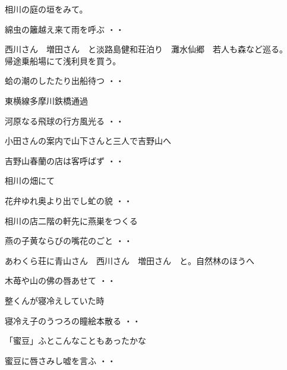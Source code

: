 \vspace{0.6cm}
相川の庭の垣をみて。
\begin{shiika}綿虫の籬越え来て雨を呼ぶ
\hfill{・・}\end{shiika}
\vspace{0.6cm}
西川さん　増田さん　と淡路島健和荘泊り　灘水仙郷　若人も森など巡る。\\
帰途乗船場にて浅利貝を買う。
\begin{shiika}蛤の潮のしたたり出船待つ
\hfill{・・}\end{shiika}
\vspace{0.6cm}
東横線多摩川鉄橋通過
\begin{shiika}河原なる飛球の行方風光る
\hfill{・・}\end{shiika}
\vspace{0.6cm}
小田さんの案内で山下さんと三人で吉野山へ
\begin{shiika}吉野山春蘭の店は客呼ばず
\hfill{・・}\end{shiika}
\vspace{0.6cm}
相川の畑にて
\begin{shiika}花弁ゆれ奥より出でし虻の貌
\hfill{・・}\end{shiika}
\vspace{0.6cm}
相川の店二階の軒先に燕巣をつくる
\begin{shiika}燕の子黄ならびの嘴花のごと
\hfill{・・}\end{shiika}
\vspace{0.6cm}
あわくら荘に青山さん　西川さん　増田さん　と。自然林のほうへ
\begin{shiika}木苺や山の佛の唇あせて
\hfill{・・}\end{shiika}
\vspace{0.6cm}
整くんが寝冷えしていた時
\begin{shiika}寝冷え子のうつろの瞳絵本散る
\hfill{・・}\end{shiika}
\vspace{0.6cm}
「蜜豆」ふとこんなこともあったかな
\begin{shiika}蜜豆に唇さみし嘘を言ふ
\hfill{・・}\end{shiika}
\vspace{0.6cm}
